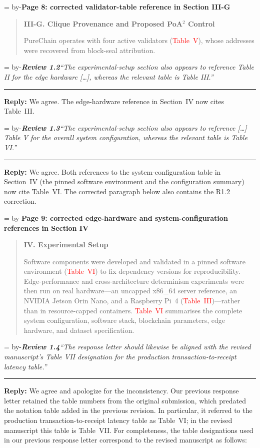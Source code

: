 \documentclass[11pt]{article}
\newenvironment{excerpt}{\begin{quote}\small\sloppy}{\end{quote}}
\newcommand{\roomfor}[1]{\par\begingroup\dimen0=\pagegoal\advance\dimen0 by-\pagetotal\ifdim\dimen0<#1\baselineskip\newpage\fi\endgroup}
\newcommand{\review}[2]{\roomfor{10}\bigskip\noindent\textbf{\textit{Review #1}}\quad\textit{``#2''}\par\smallskip\hrule\medskip}
\newcommand{\reply}{\noindent\textbf{Reply:} }
\newcommand{\loc}[1]{\roomfor{7}\medskip\noindent\textbf{#1}\par\smallskip}
\newcommand{\mshead}[2]{\par\noindent\textbf{#1. #2}\par\smallskip}
\begin{document}
\loc{Page 8: corrected validator-table reference in Section III-G}
\begin{excerpt}
\mshead{III-G}{Clique Provenance and Proposed PoA$^2$ Control}

PureChain operates with four active validators
(\textcolor{red}{Table~V}), whose addresses were recovered from
block-seal attribution.
\end{excerpt}

\review{1.2}{The experimental-setup section also appears to reference Table II for the edge hardware [\ldots], whereas the relevant table is Table III.}

\reply We agree. The edge-hardware reference in Section~IV now cites
Table~III.

\review{1.3}{The experimental-setup section also appears to reference [\ldots] Table V for the overall system configuration, whereas the relevant table is Table VI.}

\reply We agree. Both references to the system-configuration table in
Section~IV (the pinned software environment and the configuration summary)
now cite Table~VI. The corrected paragraph below also contains the R1.2
correction.

\loc{Page 9: corrected edge-hardware and system-configuration references in Section IV}
\begin{excerpt}
\mshead{IV}{Experimental Setup}

Software components were developed and validated in a pinned software
environment (\textcolor{red}{Table~VI}) to fix dependency versions for
reproducibility. Edge-performance and cross-architecture determinism
experiments were then run on real hardware---an uncapped x86\_64 server
reference, an NVIDIA Jetson Orin Nano, and a Raspberry Pi~4
(\textcolor{red}{Table~III})---rather than in resource-capped containers.
\textcolor{red}{Table~VI} summarises the complete system configuration,
software stack, blockchain parameters, edge hardware, and dataset
specification.
\end{excerpt}

\review{1.4}{The response letter should likewise be aligned with the revised manuscript's Table VII designation for the production transaction-to-receipt latency table.}

\reply We agree and apologize for the inconsistency. Our previous response
letter retained the table numbers from the original submission, which
predated the notation table added in the previous revision. In particular,
it referred to the production transaction-to-receipt latency table as
Table~VI; in the revised manuscript this table is Table~VII. For
completeness, the table designations used in our previous response letter
correspond to the revised manuscript as follows:
\end{document}
